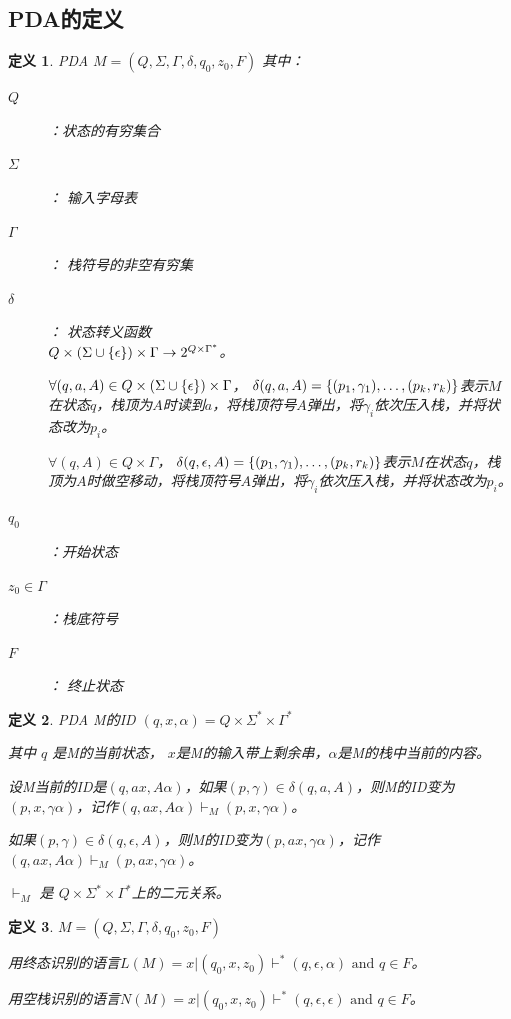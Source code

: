 \documentclass{ctexart}
\newtheorem{definition}{定义}[section]
\DeclarePairedDelimiter{\set}{\{}{\}}
\begin{document}
\subsection{PDA的定义}
\begin{definition}
    PDA $M = (Q, \Sigma, \Gamma, \delta, q_0, z_0, F)$
    其中：
    \begin{description}
        \item[$Q$]：状态的有穷集合
        \item[$\Sigma$]： 输入字母表
        \item[$\Gamma$]： 栈符号的非空有穷集
        \item[$\delta$]： 状态转义函数\\
            $Q\times (\Sigma \cup \set{\epsilon}) \times \Gamma \to 2^{Q \times \Gamma^*} $。 
            
            $\forall (q,a,A) \in Q\times (\Sigma \cup \set{\epsilon}) \times \Gamma$，
            $\delta(q,a,A) = \set{(p_1,\gamma_1),\dots,(p_k,r_k)}$表示$M$在状态$q$，栈顶为$A
            $时读到$a$，将栈顶符号$A$弹出，将$\gamma_i$依次压入栈，并将状态改为$p_i$。

            $\forall (q,A) \in Q\times \Gamma$，
            $\delta(q,\epsilon,A) = \set{(p_1,\gamma_1),\dots,(p_k,r_k)}$表示$M$在状态$q$，栈顶为$A
            $时做空移动，将栈顶符号$A$弹出，将$\gamma_i$依次压入栈，并将状态改为$p_i$。
        \item[$q_0$]：开始状态
        \item[$z_0 \in \Gamma$]：栈底符号
        \item[$F$]： 终止状态 
    \end{description}
\end{definition}

\begin{definition}
    PDA M的ID $(q, x, \alpha) = Q \times \Sigma^* \times \Gamma^*$

    其中 $q$ 是M的当前状态， $x$是M的输入带上剩余串，$\alpha$是M的栈中当前的内容。

    设M当前的ID是$(q, ax, A\alpha)$，如果$(p, \gamma) \in \delta(q, a, A)$，则M的ID变为$(p, x, \gamma \alpha)$，记作$(q, ax, A\alpha) \vdash_M (p, x, \gamma\alpha)$。

    如果$(p, \gamma) \in \delta(q, \epsilon, A)$，则M的ID变为$(p, ax, \gamma \alpha)$，记作$(q, ax, A\alpha) \vdash_M (p, ax, \gamma\alpha)$。
    
    $\vdash_M$ 是 $Q \times \Sigma^* \times \Gamma^*$上的二元关系。
\end{definition}

\begin{definition}
    $M = (Q, \Sigma, \Gamma, \delta, q_0, z_0, F)$

    用终态识别的语言$L(M) = {x | (q_0, x, z_0) \vdash^* (q, \epsilon, \alpha) \text{ and } q \in F}$。

    用空栈识别的语言$N(M) = {x | (q_0, x, z_0) \vdash^* (q, \epsilon, \epsilon) \text{ and } q \in F}$。
\end{definition}
\end{document}
